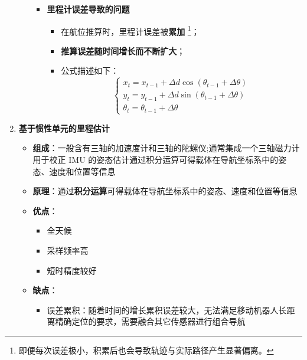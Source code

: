 \documentclass[../main.tex]{subfiles}
\begin{document}
\begin{enumerate}
\begin{itemize}
\begin{itemize}
                \item \textbf{里程计误差导致的问题}
                \begin{itemize}
                    \item 在航位推算时，里程计误差被\textbf{累加}                    \footnote{即便每次误差极小，积累后也会导致轨迹与实际路径产生显著偏离。}；
                    \item \textbf{推算误差随时间增长而不断扩大}；
                    \item 公式描述如下：
                    \[
                    \begin{cases}
                    x_t = x_{t-1} + \Delta d \cos(\theta_{t-1} + \Delta\theta) \\
                    y_t = y_{t-1} + \Delta d \sin(\theta_{t-1} + \Delta\theta) \\
                    \theta_t = \theta_{t-1} + \Delta\theta
                    \end{cases}
                    \]

                \end{itemize}
            \end{itemize}
        \end{itemize}
    \item \textbf{基于惯性单元的里程估计}\label{imu}
        \begin{itemize}
            \item \textbf{组成}：一般含有三轴的加速度计和三轴的陀螺仪;通常集成一个三轴磁力计用于校正 IMU 的姿态估计通过积分运算可得载体在导航坐标系中的姿态、速度和位置等信息
            \item \textbf{原理}：通过\textbf{积分运算}可得载体在导航坐标系中的姿态、速度和位置等信息
            \item \textbf{优点}：
                \begin{itemize}
                    \item 全天候
                    \item 采样频率高
                    \item 短时精度较好
                \end{itemize}
            \item \textbf{缺点}：
                \begin{itemize}
                    \item 误差累积：随着时间的增长累积误差较大，无法满足移动机器人长距
离精确定位的要求，需要融合其它传感器进行组合导航
                \end{itemize}
        \end{itemize}

\end{enumerate}
\end{document}
